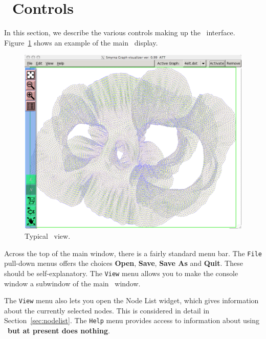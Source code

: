 \section{\smyrna\ Controls}
\label{sec:controls}

In this section, we describe the various controls making up 
the \smyrna\ interface. Figure~\ref{fig:main} shows an example of
the main \smyrna\ display.

\begin{figure}[ht] 
\begin{center}
\includegraphics[scale=.3]{figures/smyrna.png}
\caption{\small Typical \smyrna\ view.}
\label{fig:main} 
\end{center}
\end{figure}


Across the top of the main window, there is a fairly standard menu bar. 
The {\tt File} pull-down menus offers the choices {\bf Open}, {\bf Save},
{\bf Save As} and {\bf Quit}. These should be self-explanatory.
The {\tt View} menu allows you to make the console window a subwindow of the
main \smyrna\ window. 

The {\tt View} menu also lets you open the Node List widget, which 
gives information about the currently selected nodes.
This is considered in detail in Section~\ref{sec:nodelist}.
The {\tt Help} menu provides access to information about using \smyrna\ {\bf but at
present does nothing}.

